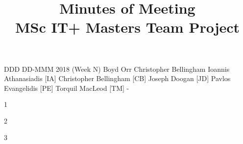 \documentclass[a4paper, 12pt]{article}
\title{Minutes of Meeting \\ MSc IT+ Masters Team Project}
\begin{document}
	\maketitle
	\momtoptable
	{DDD DD-MMM 2018 (Week N)}
	{Boyd Orr}
	{Christopher Bellingham}
	{Ioannis Athanasiadis [IA]\newline
	Christopher Bellingham [CB]\newline
	Joseph Doogan [JD]\newline
	Pavlos Evangelidis [PE]\newline
	Torquil MacLeod [TM]}
	{-}

	\begin{momitems}
		\momitem
		{1}
		{}
		{}
		{}

		\momitem
		{2}
		{}
		{}
		{}

		\momitem
		{3}
		{}
		{}
		{}
	\end{momitems}
\end{document}
